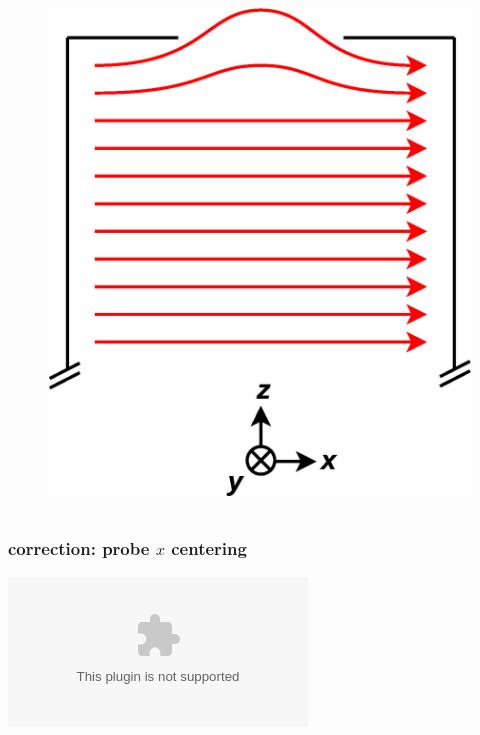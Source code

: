 \documentclass{beamer}
\newcommand{\pyplot}{\includegraphics[width=\textwidth, trim=60px 60px 60px 40px]}
\begin{document}
\begin{frame}
\begin{columns}[b]
    \begin{column}{0.5\textwidth}
    \begin{figure}
    \includegraphics[width=\textwidth]
    {figures/field_endcap.eps}
    \end{figure}
    \vspace{0pt}
    \end{column}
    
\end{columns}

\end{frame}

\begin{frame}
\frametitle{correction: probe $x$ centering}

    \begin{center}
    \pyplot{../savedplots/manyx_Bz_z.eps}
    \end{center}

\end{frame}
\end{document}
